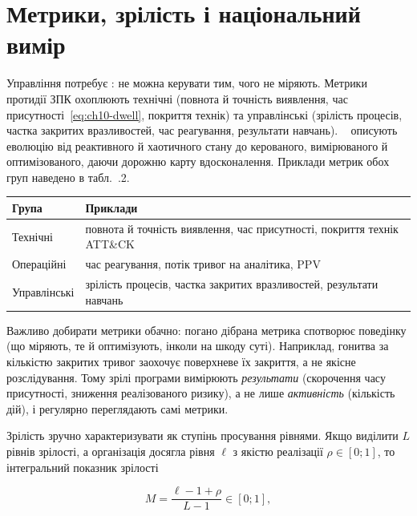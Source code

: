 \section{Метрики, зрілість і національний вимір}\label{sec:ch17-maturity}

Управління потребує : не можна керувати тим, чого не міряють. Метрики протидії ЗПК охоплюють технічні (повнота й точність виявлення, час присутності~\eqref{eq:ch10-dwell}, покриття технік) та управлінські (зрілість процесів, частка закритих вразливостей, час реагування, результати навчань). ~\cite{ch17:c2m2} описують еволюцію від реактивного й хаотичного стану до керованого, вимірюваного й оптимізованого, даючи дорожню карту вдосконалення. Приклади метрик обох груп наведено в табл.~\thechapter.2.


\begin{center}\footnotesize
\begin{tabularx}{\linewidth}{L{22mm} Y}
\toprule
Група & Приклади \\
\midrule
Технічні & повнота й точність виявлення, час присутності, покриття технік ATT\&CK \\
Операційні & час реагування, потік тривог на аналітика, PPV \\
Управлінські & зрілість процесів, частка закритих вразливостей, результати навчань \\
\bottomrule
\end{tabularx}
\end{center}

Важливо добирати метрики обачно: погано дібрана метрика спотворює поведінку (що міряють, те й оптимізують, інколи на шкоду суті). Наприклад, гонитва за кількістю закритих тривог заохочує поверхневе їх закриття, а не якісне розслідування. Тому зрілі програми вимірюють \emph{результати} (скорочення часу присутності, зниження реалізованого ризику), а не лише \emph{активність} (кількість дій), і регулярно переглядають самі метрики.

Зрілість зручно характеризувати як ступінь просування рівнями. Якщо виділити $L$ рівнів зрілості, а організація досягла рівня $\ell$ з якістю реалізації $\rho\in[0;1]$, то інтегральний показник зрілості

\begin{equation}
M = \frac{\ell - 1 + \rho}{L - 1} \in [0;1],
\label{eq:ch17-maturity}
\end{equation}

